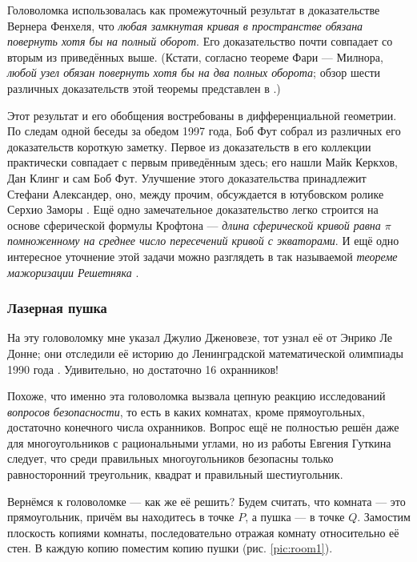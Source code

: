 \begin{addedbytheeditors}
Головоломка использовалась как промежуточный результат \cite[Satz I$'$]{fenchel}
в доказательстве Вернера Фенхеля, что \emph{любая замкнутая кривая в пространстве обязана повернуть хотя бы на полный оборот}.
Его доказательство почти совпадает со вторым из приведённых выше.
(Кстати, согласно теореме Фари --- Милнора, \emph{любой узел обязан повернуть хотя бы на два полных оборота}; обзор шести различных доказательств этой теоремы представлен в \cite{petrunin-stadler}.)

Этот результат и его обобщения востребованы в дифференциальной геометрии.
По следам одной беседы за обедом 1997 года, Боб Фут собрал из различных его доказательств короткую заметку.
Первое из доказательств в его коллекции практически совпадает с первым приведённым здесь;
его нашли Майк Керкхов, Дан Клинг и сам Боб Фут.
Улучшение этого доказательства принадлежит Стефани Александер, оно, между прочим, обсуждается в ютубовском ролике Серхио Заморы \cite{zamora}.
Ещё одно замечательное доказательство легко строится на основе сферической формулы Крофтона --- \emph{длина сферической кривой равна $\pi$ помноженному на среднее число пересечений кривой с экваторами}.
И ещё одно интересное уточнение этой задачи можно разглядеть в так называемой \emph{теореме мажоризации Решетняка} \cite{reshetnyak}.\pr
\end{addedbytheeditors}

\subsubsection*{Лазерная пушка}

На эту головоломку мне указал Джулио Дженовезе, тот узнал её от Энрико Ле Донне; они отследили её историю до Ленинградской математической олимпиады 1990 года \cite{17}.
Удивительно, но достаточно 16 охранников!

Похоже, что именно эта головоломка вызвала цепную реакцию исследований \emph{вопросов безопасности}, то есть в каких комнатах, кроме прямоугольных, достаточно конечного числа охранников.
Вопрос ещё не полностью решён даже для многоугольников с рациональными углами, но из работы Евгения Гуткина \cite{34} следует, что среди правильных многоугольников безопасны только равносторонний треугольник, квадрат и правильный шестиугольник.

Вернёмся к головоломке --- как же её решить?
Будем считать, что комната --- это прямоугольник, причём вы находитесь в точке $P$, а пушка --- в точке $Q$.
Замостим плоскость копиями комнаты, последовательно отражая комнату относительно её стен.
В каждую копию поместим копию пушки (рис. \ref{pic:room1}).

